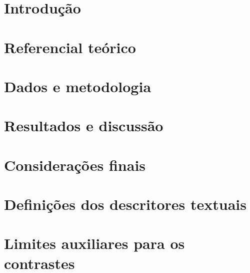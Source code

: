 \documentclass[12pt,a4paper,twoside]{article}
\numberwithin{equation}{subsection}
\begin{document}
\hypersetup{pageanchor=false}


\clearpage{}\hypersetup{pageanchor=true}
\onehalfspacing

\clearpage\listoftables
\clearpage\listoffigures
\clearpage\tableofcontents
\clearpage{}
\section{Introdução}\label{sec:introducao}

\clearpage\section{Referencial teórico}\label{sec:teoria}

\clearpage\section{Dados e metodologia}\label{sec:metodologia}

\clearpage\section{Resultados e discussão}\label{sec:resultados}

\clearpage\section{Considerações finais}\label{sec:conclusao}

\clearpage{}

\begingroup\small\singlespacing\raggedright
{}

\endgroup
\clearpage\appendix
\section{Definições dos descritores textuais}\label{ap:descritores}

\clearpage\section{Limites auxiliares para os contrastes}\label{ap:incerteza}
\setcounter{equation}{0}
\renewcommand{\theequation}{\thesection.\arabic{equation}}

\end{document}
